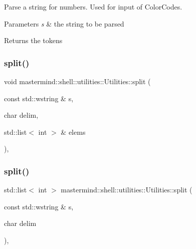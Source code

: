 Parse a string for numbers. Used for input of Color\+Codes. 


\begin{DoxyParams}{Parameters}
{\em s} & the string to be parsed \\
\hline
\end{DoxyParams}
\begin{DoxyReturn}{Returns}
the tokens 
\end{DoxyReturn}
\hypertarget{classmastermind_1_1shell_1_1utilities_1_1_utilities_a546b49b8a9c3a5e53400d48d6b6f5126}{}\label{classmastermind_1_1shell_1_1utilities_1_1_utilities_a546b49b8a9c3a5e53400d48d6b6f5126} 
\subsubsection{\texorpdfstring{split()}{split()}\hspace{0.1cm}{\footnotesize\ttfamily [1/2]}}
{\footnotesize\ttfamily void mastermind\+::shell\+::utilities\+::\+Utilities\+::split (\begin{DoxyParamCaption}\item[{const std\+::wstring \&}]{s,  }\item[{char}]{delim,  }\item[{std\+::list$<$ int $>$ \&}]{elems }\end{DoxyParamCaption})\hspace{0.3cm}{\ttfamily [static]}, {\ttfamily [protected]}}

\hypertarget{classmastermind_1_1shell_1_1utilities_1_1_utilities_a6fe21ac1d92d80b2380d27a4ebd657cb}{}\label{classmastermind_1_1shell_1_1utilities_1_1_utilities_a6fe21ac1d92d80b2380d27a4ebd657cb} 
\subsubsection{\texorpdfstring{split()}{split()}\hspace{0.1cm}{\footnotesize\ttfamily [2/2]}}
{\footnotesize\ttfamily std\+::list$<$ int $>$ mastermind\+::shell\+::utilities\+::\+Utilities\+::split (\begin{DoxyParamCaption}\item[{const std\+::wstring \&}]{s,  }\item[{char}]{delim }\end{DoxyParamCaption})\hspace{0.3cm}{\ttfamily [static]}, {\ttfamily [protected]}}



